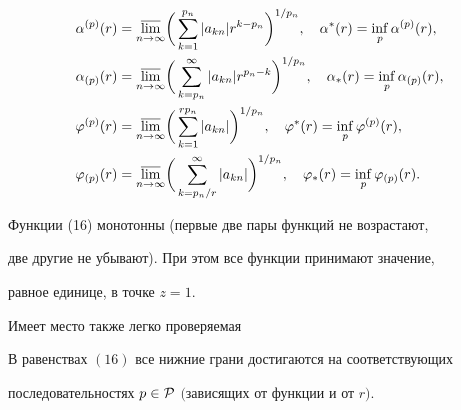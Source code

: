 \begin{equation} 


\begin{split}


\alpha^{(p)}(r)&=\underset{n\to\infty}{\varlimsup}{}


\bigg(\sum^{p_n}_{k=1}|a_{kn}|r^{k-p_n}\bigg)^{1/p_n}, 


\quad \alpha^*(r)=\inf_p \alpha^{(p)}(r),\\ 


% 


\alpha_{(p)}(r)&=\underset{n\to\infty}{\varlimsup}{}


\bigg(\sum^\infty_{k=p_n}|a_{kn}|r^{p_n-k}\bigg)^{1/p_n}, 


\quad \alpha_*(r)=\inf_p \alpha_{(p)}(r),\\ 


%


\varphi^{(p)}(r)&=\underset{n\to\infty}{\varlimsup}{}


\bigg(\sum^{r p_n}_{k=1}|a_{kn}|\bigg)^{1/p_n}, 


\quad \varphi^*(r)=\inf_p \varphi^{(p)}(r), \\ 


%


\varphi_{(p)}(r)&=\underset{n\to\infty}{\varlimsup}{}


\bigg(\sum^\infty_{k=p_n/r}|a_{kn}|\bigg)^{1/p_n}, 


\quad \varphi_*(r)=\inf_p \varphi_{(p)}(r).


\end{split}


\end{equation} 


Функции (16) монотонны (первые две пары функций не возрастают, 


две другие не убывают). При этом все функции принимают значение, 


равное единице, в точке $z=1$. 


Имеет место также легко проверяемая 


 


\begin{lem} 


В равенствах $(16)$ все нижние грани достигаются на соответствующих 


последовательностях $p\in\cal P$ $($зависящих от функции и от $r)$. 


\end{lem} 


